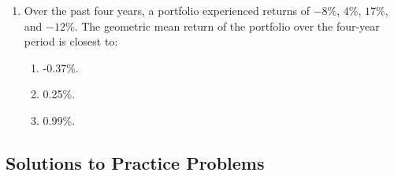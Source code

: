 \begin{enumerate}
	\item Over the past four years, a portfolio experienced returns of $-8\%$, $4\%$, $17\%$, and $-12\%$. The geometric mean return of the portfolio over the four-year period is closest to:
	      \begin{enumerate}[label=\Alph*.]
		      \item -0.37\%.
		      \item 0.25\%.
		      \item 0.99\%.
	      \end{enumerate}
\end{enumerate}

\subsection{Solutions to Practice Problems}
\label{subsec:app_Solutions_M1}

